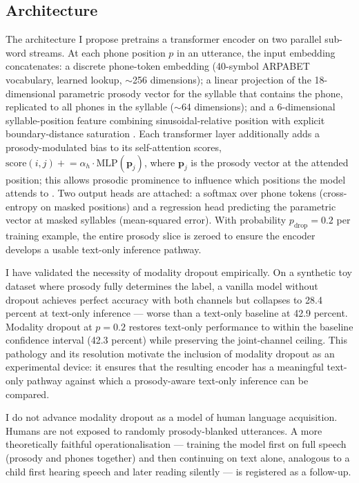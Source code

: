 \documentclass[11pt,letterpaper]{article}
\begin{document}
\subsection{Architecture}

The architecture I propose pretrains a transformer encoder on two parallel sub-word streams. At each phone position $p$ in an utterance, the input embedding concatenates: a discrete phone-token embedding (40-symbol ARPABET vocabulary, learned lookup, $\sim$256 dimensions); a linear projection of the 18-dimensional parametric prosody vector for the syllable that contains the phone, replicated to all phones in the syllable ($\sim$64 dimensions); and a 6-dimensional syllable-position feature combining sinusoidal-relative position with explicit boundary-distance saturation \citep{press2022alibi}. Each transformer layer additionally adds a prosody-modulated bias to its self-attention scores, $\text{score}(i, j) \mathrel{+}= \alpha_h \cdot \text{MLP}(\mathbf{p}_j)$, where $\mathbf{p}_j$ is the prosody vector at the attended position; this allows prosodic prominence to influence which positions the model attends to \citep{rajaa2023, menon2025}. Two output heads are attached: a softmax over phone tokens (cross-entropy on masked positions) and a regression head predicting the parametric vector at masked syllables (mean-squared error). With probability $p_{\text{drop}} = 0.2$ per training example, the entire prosody slice is zeroed to ensure the encoder develops a usable text-only inference pathway.

I have validated the necessity of modality dropout empirically. On a synthetic toy dataset where prosody fully determines the label, a vanilla model without dropout achieves perfect accuracy with both channels but collapses to 28.4 percent at text-only inference --- worse than a text-only baseline at 42.9 percent. Modality dropout at $p = 0.2$ restores text-only performance to within the baseline confidence interval (42.3 percent) while preserving the joint-channel ceiling. This pathology and its resolution motivate the inclusion of modality dropout as an experimental device: it ensures that the resulting encoder has a meaningful text-only pathway against which a prosody-aware text-only inference can be compared.

I do not advance modality dropout as a model of human language acquisition. Humans are not exposed to randomly prosody-blanked utterances. A more theoretically faithful operationalisation --- training the model first on full speech (prosody and phones together) and then continuing on text alone, analogous to a child first hearing speech and later reading silently --- is registered as a follow-up.
\end{document}
